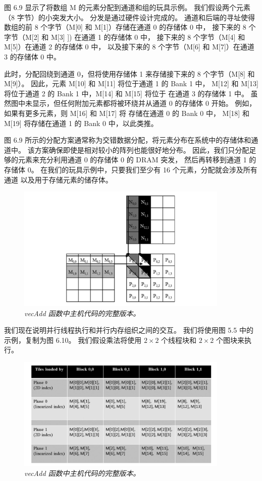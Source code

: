 图 6.9 显示了将数组 M 的元素分配到通道和组的玩具示例。 我们假设两个元素（8 字节）的小突发大小。 
分发是通过硬件设计完成的。 通道和后端的寻址使得数组的前 8 个字节（M[0] 和 M[1]）存储在通道 0 的存储体 0 中，
接下来的 8 个字节（M[2] 和 M[3] ]) 在通道 1 的存储体 0 中，
接下来的 8 个字节（M[4] 和 M[5]）在通道 2 的存储体 0 中，
以及接下来的 8 个字节（M[6] 和 M[7]）在通道 3 的存储体 0 中。

此时，分配回绕到通道 0，但将使用存储体 1 来存储接下来的 8 个字节（M[8] 和 M[9]）。 
因此，元素 M[10] 和 M[11] 将位于通道 1 的 Bank 1 中，
M[12] 和 M[13] 将位于通道 2 的 Bank 1 中，M[14] 和 M[15] 将位于 在通道 3 的存储体 1 中。
虽然图中未显示，但任何附加元素都将被环绕并从通道 0 的存储体 0 开始。
例如，如果有更多元素，则 M[16] 和 M[17] 将 存储在通道 0 的 Bank 0 中，
M[18] 和 M[19] 将存储在通道 1 的 Bank 0 中，以此类推。

图 6.9 所示的分配方案通常称为交错数据分配，将元素分布在系统中的存储体和通道中。 
该方案确保即使是相对较小的阵列也能很好地分布。 因此，我们只分配足够的元素来充分利用通道 0 的存储体 0 的 DRAM 突发，
然后再转移到通道 1 的存储体 0。
在我们的玩具示例中，只要我们至少有 16 个元素，分配就会涉及所有通道 以及用于存储元素的储存体。

\begin{figure}[H]
	\centering
	\includegraphics[width=0.9\textwidth]{figs/F6.10.png}
	\caption{\textit{\color{red} vecAdd 函数中主机代码的完整版本。}}
\end{figure}

我们现在说明并行线程执行和并行内存组织之间的交互。 我们将使用图 5.5 中的示例，复制为图 6.10。 
我们假设乘法将使用 $2 \times 2$ 个线程块和 $2 \times 2$ 个图块来执行。

\begin{figure}[H]
	\centering
	\includegraphics[width=0.9\textwidth]{figs/F6.11.png}
	\caption{\textit{\color{red} vecAdd 函数中主机代码的完整版本。}}
\end{figure}

